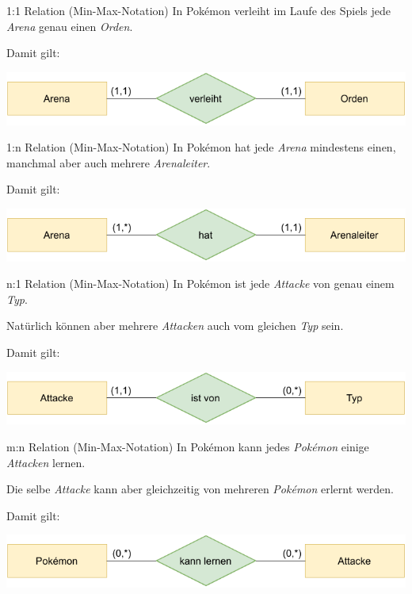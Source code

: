 \newpage

\begin{example}{1:1 Relation (Min-Max-Notation)}
    In Pokémon verleiht im Laufe des Spiels jede \emph{Arena} genau einen \emph{Orden}.

    Damit gilt:
    \begin{center}
        \includegraphics[width=0.7\linewidth]{includes/figures/example_entity_relationship_modell_min_max_one_to_one.pdf}
    \end{center}
\end{example}

\begin{example}{1:n Relation (Min-Max-Notation)}
    In Pokémon hat jede \emph{Arena} mindestens einen, manchmal aber auch mehrere \emph{Arenaleiter}.

    Damit gilt:
    \begin{center}
        \includegraphics[width=0.7\linewidth]{includes/figures/example_entity_relationship_modell_min_max_one_to_many.pdf}
    \end{center}
\end{example}

\begin{example}{n:1 Relation (Min-Max-Notation)}
    In Pokémon ist jede \emph{Attacke} von genau einem \emph{Typ}.

    Natürlich können aber mehrere \emph{Attacken} auch vom gleichen \emph{Typ} sein.

    Damit gilt:
    \begin{center}
        \includegraphics[width=0.7\linewidth]{includes/figures/example_entity_relationship_modell_min_max_many_to_one.pdf}
    \end{center}
\end{example}

\begin{example}{m:n Relation (Min-Max-Notation)}
    In Pokémon kann jedes \emph{Pokémon} einige \emph{Attacken} lernen.

    Die selbe \emph{Attacke} kann aber gleichzeitig von mehreren \emph{Pokémon} erlernt werden.

    Damit gilt:
    \begin{center}
        \includegraphics[width=0.7\linewidth]{includes/figures/example_entity_relationship_modell_min_max_many_to_many.pdf}
    \end{center}
\end{example}


